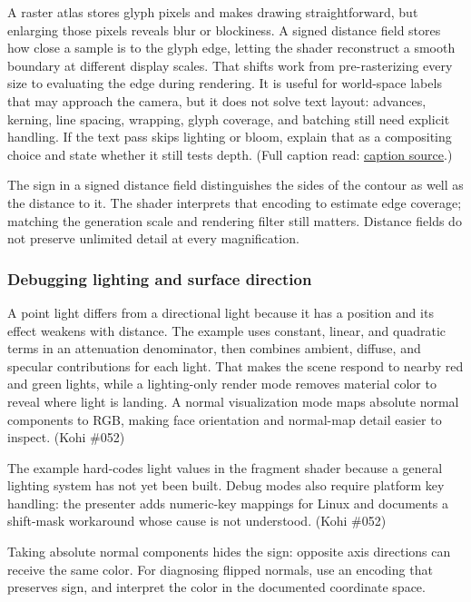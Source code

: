 A raster atlas stores glyph pixels and makes drawing straightforward, but enlarging those pixels reveals blur or blockiness. A signed distance field stores how close a sample is to the glyph edge, letting the shader reconstruct a smooth boundary at different display scales. That shifts work from pre-rasterizing every size to evaluating the edge during rendering. It is useful for world-space labels that may approach the camera, but it does not solve text layout: advances, kerning, line spacing, wrapping, glyph coverage, and batching still need explicit handling. If the text pass skips lighting or bloom, explain that as a compositing choice and state whether it still tests depth. (Full caption read: \href{https://www.youtube.com/watch?v=od_aKE_m38Y}{caption source}.)

The sign in a signed distance field distinguishes the sides of the contour as well as the distance to it. The shader interprets that encoding to estimate edge coverage; matching the generation scale and rendering filter still matters. Distance fields do not preserve unlimited detail at every magnification.

\subsubsection{Debugging lighting and surface direction}\label{06-engine-ii-ch026-debugging-lighting-and-surface-direction}

A point light differs from a directional light because it has a position and its effect weakens with distance. The example uses constant, linear, and quadratic terms in an attenuation denominator, then combines ambient, diffuse, and specular contributions for each light. That makes the scene respond to nearby red and green lights, while a lighting-only render mode removes material color to reveal where light is landing. A normal visualization mode maps absolute normal components to RGB, making face orientation and normal-map detail easier to inspect. (Kohi \#052)

The example hard-codes light values in the fragment shader because a general lighting system has not yet been built. Debug modes also require platform key handling: the presenter adds numeric-key mappings for Linux and documents a shift-mask workaround whose cause is not understood. (Kohi \#052)

Taking absolute normal components hides the sign: opposite axis directions can receive the same color. For diagnosing flipped normals, use an encoding that preserves sign, and interpret the color in the documented coordinate space.

